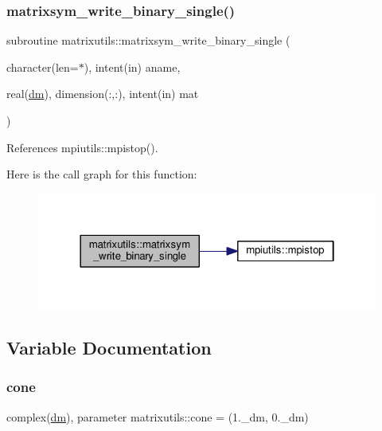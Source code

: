 \subsubsection{\texorpdfstring{matrixsym\+\_\+write\+\_\+binary\+\_\+single()}{matrixsym\_write\_binary\_single()}}
{\footnotesize\ttfamily subroutine matrixutils\+::matrixsym\+\_\+write\+\_\+binary\+\_\+single (\begin{DoxyParamCaption}\item[{character(len=$\ast$), intent(in)}]{aname,  }\item[{real(\mbox{\hyperlink{namespacematrixutils_a7bdc564986ea4d90f51201c75606ef3d}{dm}}), dimension(\+:,\+:), intent(in)}]{mat }\end{DoxyParamCaption})}



References mpiutils\+::mpistop().

Here is the call graph for this function\+:
\nopagebreak
\begin{figure}[H]
\begin{center}
\leavevmode
\includegraphics[width=322pt]{namespacematrixutils_acbfa12c533184738072f7f9a35e7cfc7_cgraph}
\end{center}
\end{figure}


\subsection{Variable Documentation}
\mbox{\label{namespacematrixutils_a0a58a765b3eead806d9adb27694692d8}} 
\subsubsection{\texorpdfstring{cone}{cone}}
{\footnotesize\ttfamily complex(\mbox{\hyperlink{namespacematrixutils_a7bdc564986ea4d90f51201c75606ef3d}{dm}}), parameter matrixutils\+::cone = (1.\+\_\+dm, 0.\+\_\+dm)}



